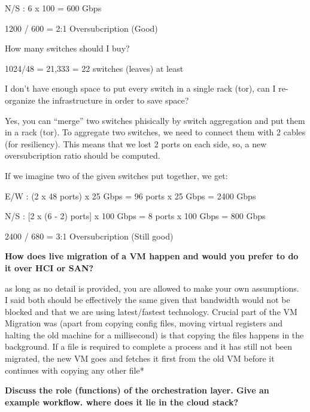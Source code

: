 N/S : 6 x 100 = 600 Gbps

1200 / 600 = 2:1 Oversubcription (Good) 

How many switches should I buy?

1024/48 = 21,333 = 22 switches (leaves) at least 

I don't have enough space to put every switch in a single rack (tor),
can I re-organize the infrastructure in order to save space?

Yes, you can ``merge'' two switches phisically by switch aggregation and
put them in a rack (tor). To aggregate two switches, we need to connect
them with 2 cables (for resiliency). This means that we lost 2 ports on
each side, so, a new oversubcription ratio should be computed.

If we imagine two of the given switches put together, we get:

E/W : (2 x 48 ports) x 25 Gbps = 96 ports x 25 Gbps = 2400 Gbps

N/S : {[}2 x (6 - 2) ports{]} x 100 Gbps = 8 ports x 100 Gbps = 800 Gbps

2400 / 680 = 3:1 Oversubcription (Still good)

\textbf{How does live migration of a VM happen and would you prefer to
do it over HCI or SAN?}

as long as no detail is provided, you are allowed to make your own
assumptions.\\
I said both should be effectively the same given that bandwidth would
not be blocked and that we are using latest/fastest technology. Crucial
part of the VM Migration was (apart from copying config files, moving
virtual registers and halting the old machine for a millisecond) is that
copying the files happens in the background. If a file is required to
complete a process and it has still not been migrated, the new VM goes
and fetches it first from the old VM before it continues with copying
any other file*\\

\textbf{Discuss the role (functions) of the orchestration layer. Give an
example workflow. where does it lie in the cloud stack?}

